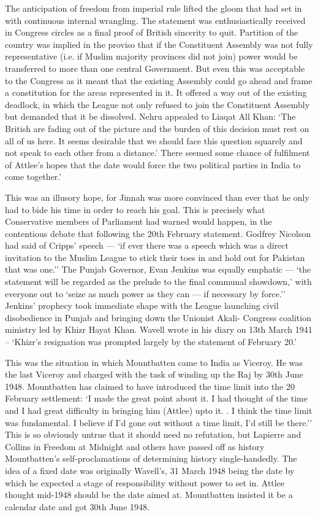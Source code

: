 \begin{multicols}{2}
The anticipation of freedom from imperial rule lifted the gloom that had set in with continuous internal wrangling. The statement was enthusiastically received in Congress circles as a final proof of British sincerity to quit. Partition of the country was implied in the proviso that if the Constituent Assembly was not fully representative (i.e. if Muslim majority provinces did not join) power would be transferred to more than one central Government. But even this was acceptable to the Congress as it meant that the existing Assembly could go ahead and frame a constitution for the areas represented in it. It offered a way out of the existing deadlock, in which the League not only refused to join the Constituent Assembly but demanded that it be dissolved. Nehru appealed to Liaqat All Khan: `The British are fading out of the picture and the burden of this decision must rest on all of us here. It seems desirable that we should face this question squarely and not speak to each other from a distance.' There seemed some chance of fulfilment of Attlee's hopes that the date would force the two political parties in India to come together.' 

This was an illusory hope, for Jinnah was more convinced than ever that he only had to bide his time in order to reach his goal. This is precisely what Conservative members of Parliament had warned would happen, in the contentious debate that following the 20th February statement. Godfrey Nicolson had said of Cripps' speech --- `if ever there was a speech which was a direct invitation to the Muslim League to stick their toes in and hold out for Pakistan that was one.'' The Punjab Governor, Evan Jenkins was equally emphatic --- `the statement will be regarded as the prelude to the final communal showdown,' with everyone out to `seize as much power as they can --- if necessary by force.'' Jenkins' prophecy took immediate shape with the League launching civil disobedience in Punjab and bringing down the Unionist Akali- Congress coalition ministry led by Khizr Hayat Khan. Wavell wrote in his diary on 13th March 1941 -- `Khizr's resignation was prompted largely by the statement of February 20.' 

This was the situation in which Mountbatten came to India as Viceroy. He was the last Viceroy and charged with the task of winding up the Raj by 30th June 1948. Mountbatten has claimed to have introduced the time limit into the 20 February settlement: `I made the great point about it. I had thought of the time and I had great difficulty in bringing him (Attlee) upto it. . I think the time limit was fundamental. I believe if I'd gone out without a time limit, I'd still be there.'' This is so obviously untrue that it should need no refutation, but Lapierre and Collins in Freedom at Midnight and others have passed off as history Mountbatten's self-proclamations of determining history single-handedly. The idea of a fixed date was originally Wavell's, 31 March 1948 being the date by which he expected a stage of responsibility without power to set in. Attlee thought mid-1948 should be the date aimed at. Mountbatten insisted it be a calendar date and got 30th June 1948. 


\end{multicols}
